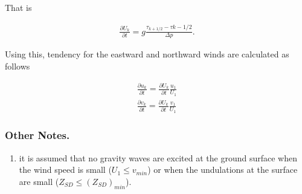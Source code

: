 That is

\begin{eqnarray}
  \frac{\partial U_{k}}{\partial t}
        =  g  \frac{\tau_{k+1/2} - \tau{k-1/2}}{\Delta p}.
\end{eqnarray}

Using this, tendency for the eastward and northward winds are calculated
as follows

\begin{eqnarray}
  \frac{\partial u_{k}}{\partial t}  =
           \frac{\partial U_{k}}{\partial t} \frac{u_{1}}{U_{1}} \\
  \frac{\partial v_{k}}{\partial t}  =
           \frac{\partial U_{k}}{\partial t} \frac{v_{1}}{U_{1}}
\end{eqnarray}

\hypertarget{other-notes.}{%
\subsubsection{Other Notes.}\label{other-notes.}}

\begin{enumerate}
\def\labelenumi{\arabic{enumi}.}
\tightlist
\item
  it is assumed that no gravity waves are excited at the ground surface
  when the wind speed is small (\(U_{1} \le v_{min}\)) or when the
  undulations at the surface are small (\(Z_{SD} \le (Z_{SD})_{min}\)).
\end{enumerate}
